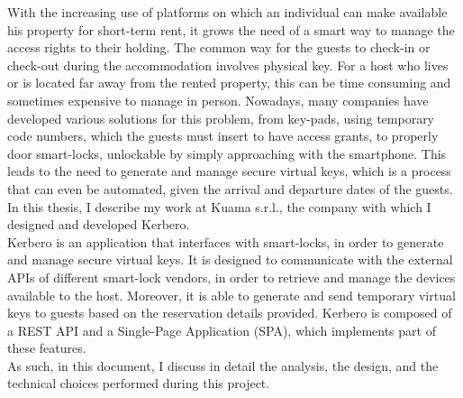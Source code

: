 
With the increasing use of platforms on which an individual can make available his property for short-term rent, it grows the need of a smart way to manage the access rights to their holding. The common way for the guests to check-in or check-out during the accommodation involves physical key. For a host who lives or is located far away from the rented property, this can be time consuming and sometimes expensive to manage in person. Nowadays, many companies have developed various solutions for this problem, from key-pads, using temporary code numbers, which the guests must insert to have access grants, to properly door smart-locks, unlockable by simply approaching with the smartphone. This leads to the need to generate and manage secure virtual keys, which is a process that can even be automated, given the arrival and departure dates of the guests. 
\\ In this thesis, I describe my work at Kuama s.r.l., the company with which I designed and developed Kerbero. 
\\ Kerbero is an application that interfaces with smart-locks, in order to generate and manage secure virtual keys. It is designed to communicate with the external APIs of different smart-lock vendors, in order to retrieve and manage the devices available to the host. Moreover, it is able to generate and send temporary virtual keys to guests based on the reservation details provided. Kerbero is composed of a REST API and a Single-Page Application (SPA), which implements part of these features. \\ As such, in this document, I discuss in detail the analysis, the design, and the technical choices performed during this project.
